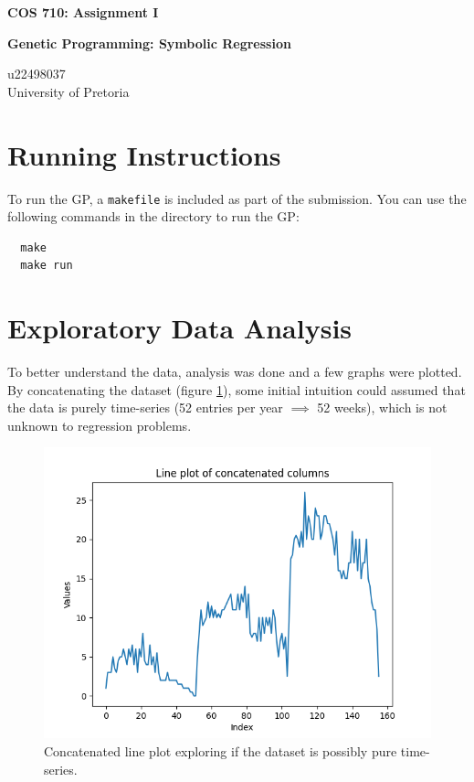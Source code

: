 \documentclass{article}
\begin{document}
\begin{titlepage}
\begin{center}


{\huge \textbf{COS 710: Assignment I}}

\vspace{1cm}

{\Large \textbf{Genetic Programming: Symbolic Regression}}

\vspace{1cm}

{\large u22498037 \\
University of Pretoria}

\vfill

\end{center}
\end{titlepage}

\tableofcontents

\section{Running Instructions}
To run the GP, a \texttt{makefile} is included as part of the submission. You can use the following commands in the directory to run the GP:

\begin{verbatim}
  make
  make run
\end{verbatim}

\section{Exploratory Data Analysis}
To better understand the data, analysis was done and a few graphs were plotted. By concatenating the dataset (figure \ref{fig:concat}), some initial intuition could assumed that the data is purely time-series (52 entries per year \(\implies\) 52 weeks), which is not unknown to regression problems.

\begin{figure}[H]
  \includegraphics[width=\linewidth]{concatenated line plot.png}
  \caption{Concatenated line plot exploring if the dataset is possibly pure time-series.}
  \label{fig:concat}
\end{figure}
\end{document}
